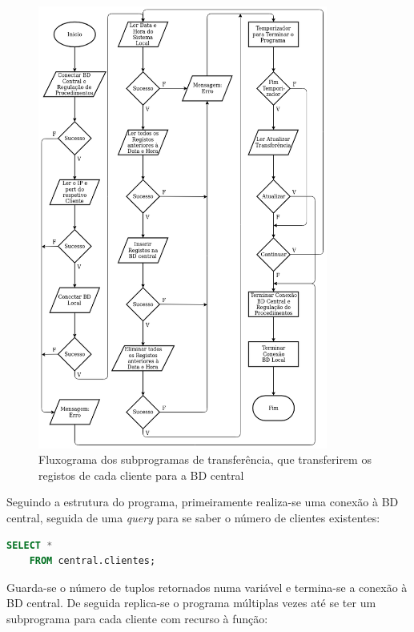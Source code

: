 \documentclass[11pt,twoside,a4paper]{report}
\begin{document}
\begin{figure}
	\begin{center}
		\includegraphics[width=0.85\textwidth]{fluxograma_transferencia_subprograma4} %
		\caption[Fluxograma dos subprogramas de transferência]{Fluxograma dos subprogramas de transferência, que transferirem os registos de cada cliente para a BD central}
		\label{fig:transferencia_subprograma}
	\end{center}
\end{figure}
Seguindo a estrutura do programa, primeiramente realiza-se uma conexão à BD central, seguida de uma \textit{query} para se saber o número de clientes existentes:
\begin{lstlisting}[language = SQL]
	SELECT *
	FROM central.clientes;
\end{lstlisting}
Guarda-se o número de tuplos retornados numa variável e termina-se a conexão à BD central. De seguida replica-se o programa múltiplas vezes até se ter um subprograma para cada cliente com recurso à função:
\end{document}

